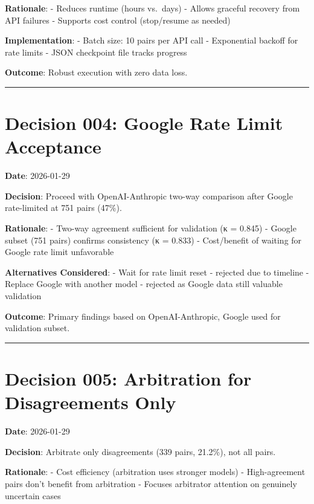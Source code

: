 \documentclass[
  letterpaper,
]{report}
\begin{document}
\textbf{Rationale}: - Reduces runtime (hours vs.~days) - Allows graceful
recovery from API failures - Supports cost control (stop/resume as
needed)

\textbf{Implementation}: - Batch size: 10 pairs per API call -
Exponential backoff for rate limits - JSON checkpoint file tracks
progress

\textbf{Outcome}: Robust execution with zero data loss.

\begin{center}\rule{0.5\linewidth}{0.5pt}\end{center}

\section{Decision 004: Google Rate Limit
Acceptance}\label{decision-004-google-rate-limit-acceptance}

\textbf{Date}: 2026-01-29

\textbf{Decision}: Proceed with OpenAI-Anthropic two-way comparison
after Google rate-limited at 751 pairs (47\%).

\textbf{Rationale}: - Two-way agreement sufficient for validation (κ =
0.845) - Google subset (751 pairs) confirms consistency (κ = 0.833) -
Cost/benefit of waiting for Google rate limit unfavorable

\textbf{Alternatives Considered}: - Wait for rate limit reset - rejected
due to timeline - Replace Google with another model - rejected as Google
data still valuable validation

\textbf{Outcome}: Primary findings based on OpenAI-Anthropic, Google
used for validation subset.

\begin{center}\rule{0.5\linewidth}{0.5pt}\end{center}

\section{Decision 005: Arbitration for Disagreements
Only}\label{decision-005-arbitration-for-disagreements-only}

\textbf{Date}: 2026-01-29

\textbf{Decision}: Arbitrate only disagreements (339 pairs, 21.2\%), not
all pairs.

\textbf{Rationale}: - Cost efficiency (arbitration uses stronger models)
- High-agreement pairs don't benefit from arbitration - Focuses
arbitrator attention on genuinely uncertain cases
\end{document}
